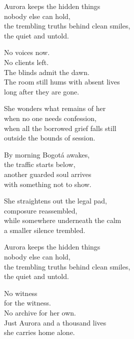 \begin{lyrics}
Aurora keeps the hidden things\\
nobody else can hold,\\
the trembling truths behind clean smiles,\\
the quiet and untold.

No voices now.\\
No clients left.\\
The blinds admit the dawn.\\
The room still hums with absent lives\\
long after they are gone.

She wonders what remains of her\\
when no one needs confession,\\
when all the borrowed grief falls still\\
outside the bounds of session.

By morning Bogotá awakes,\\
the traffic starts below,\\
another guarded soul arrives\\
with something not to show.

She straightens out the legal pad,\\
composure reassembled,\\
while somewhere underneath the calm\\
a smaller silence trembled.

Aurora keeps the hidden things\\
nobody else can hold,\\
the trembling truths behind clean smiles,\\
the quiet and untold.

No witness\\
for the witness.\\
No archive for her own.\\
Just Aurora and a thousand lives\\
she carries home alone.

\end{lyrics}

